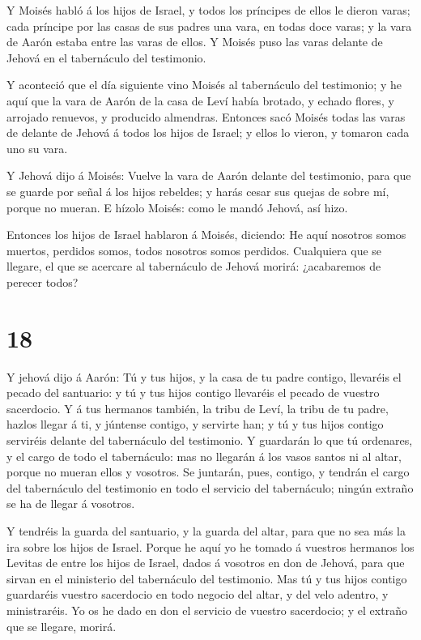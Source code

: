  Y Moisés habló á los hijos de Israel, y todos los príncipes
de ellos le dieron varas; cada príncipe por las casas de sus padres una
vara, en todas doce varas; y la vara de Aarón estaba entre las varas de
ellos.  Y Moisés puso las varas delante de Jehová en el
tabernáculo del testimonio.

 Y aconteció que el día siguiente vino Moisés al tabernáculo
del testimonio; y he aquí que la vara de Aarón de la casa de Leví había
brotado, y echado flores, y arrojado renuevos, y producido almendras.
 Entonces sacó Moisés todas las varas de delante de Jehová á
todos los hijos de Israel; y ellos lo vieron, y tomaron cada uno su
vara.

 Y Jehová dijo á Moisés: Vuelve la vara de Aarón delante
del testimonio, para que se guarde por señal á los hijos rebeldes; y
harás cesar sus quejas de sobre mí, porque no mueran.  E
hízolo Moisés: como le mandó Jehová, así hizo.

 Entonces los hijos de Israel hablaron á Moisés, diciendo:
He aquí nosotros somos muertos, perdidos somos, todos nosotros somos
perdidos.  Cualquiera que se llegare, el que se acercare al
tabernáculo de Jehová morirá: ¿acabaremos de perecer todos?

\hypertarget{section-17}{%
\section{18}\label{section-17}}

 Y jehová dijo á Aarón: Tú y tus hijos, y la casa de tu
padre contigo, llevaréis el pecado del santuario: y tú y tus hijos
contigo llevaréis el pecado de vuestro sacerdocio.  Y á tus
hermanos también, la tribu de Leví, la tribu de tu padre, hazlos llegar
á ti, y júntense contigo, y servirte han; y tú y tus hijos contigo
serviréis delante del tabernáculo del testimonio.  Y
guardarán lo que tú ordenares, y el cargo de todo el tabernáculo: mas no
llegarán á los vasos santos ni al altar, porque no mueran ellos y
vosotros.  Se juntarán, pues, contigo, y tendrán el cargo
del tabernáculo del testimonio en todo el servicio del tabernáculo;
ningún extraño se ha de llegar á vosotros.

 Y tendréis la guarda del santuario, y la guarda del altar,
para que no sea más la ira sobre los hijos de Israel. 
Porque he aquí yo he tomado á vuestros hermanos los Levitas de entre los
hijos de Israel, dados á vosotros en don de Jehová, para que sirvan en
el ministerio del tabernáculo del testimonio.  Mas tú y tus
hijos contigo guardaréis vuestro sacerdocio en todo negocio del altar, y
del velo adentro, y ministraréis. Yo os he dado en don el servicio de
vuestro sacerdocio; y el extraño que se llegare, morirá.

